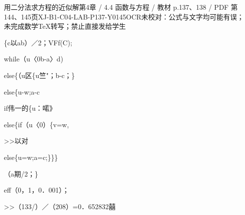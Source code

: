 \begin{bankitem}{用二分法求方程的近似解}{第4章 / 4.4 函数与方程 / 教材 p.137、138 / PDF 第144、145页}{XJ-B1-C04-LAB-P137-Y0145}{OCR未校对：公式与文字均可能有误；未完成数学TeX转写；禁止直接发给学生}
\begin{ocrdraft}
\par
\{c以ab）／2；VFf(C);
\par
while（u〈0b-a〉d)
\par
else\{（u区\{u竺"；b-c；\}
\par
else\{u-w;a-c
\par
if伟一的\{u：喏》
\par
else\{if（u〈0）\{v=w,
\par
>>以对
\par
else\{u=w;a=c;\}\}\}
\par
（a期/2；\}
\par
eff（0，1，0．001）；
\par
>>（133/）／（208）=0．652832囍
\end{ocrdraft}
\end{bankitem}
